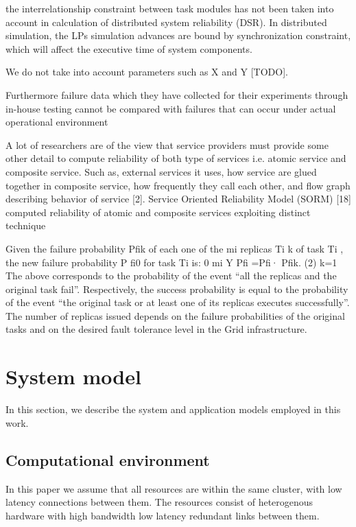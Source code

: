 \documentclass{cslthse-msc}
\begin{document}
the interrelationship constraint between task modules has not been taken into account in calculation of distributed system reliability (DSR). In distributed simulation, the LPs simulation advances are bound by synchronization constraint, which will affect the executive time of system components. \cite{relModelDistSimSystem}

We do not take into account parameters such as X and Y [TODO].

Furthermore failure data which they have collected for their experiments through in-house testing cannot be compared with failures that can occur under actual operational environment \cite{surveyReliabilityDistr}

A lot of researchers are of the view that service providers must provide some other detail to compute reliability of both type of services i.e. atomic service and composite service. Such as, external services it uses, how service are glued together in composite service, how frequently they call each other, and flow graph describing behavior of service [2]. Service Oriented Reliability Model (SORM) [18] computed reliability of atomic and composite services exploiting distinct technique \cite{surveyReliabilityDistr}

Given the failure probability Pfik of each one of the mi replicas Ti k of task Ti , the new failure probability P fi0 for task Ti is:
0 mi Y
Pfi =Pfi· Pfik. (2) k=1
The above corresponds to the probability of the event “all the replicas and the original task fail”. Respectively, the success probability is equal to the probability of the event “the original task or at least one of its replicas executes successfully”. The number of replicas issued depends on the failure probabilities of the original tasks and on the desired fault tolerance level in the Grid infrastructure.  \cite{effTaskReplMobGrid}
\fi

\section{System model} \label{sec:design_system_model}
In this section, we describe the system and application models employed in this work.

\subsection{Computational environment} \label{subsec:design_comp_env}
In this paper we assume that all resources are within the same cluster, with low latency connections between them. The resources consist of heterogenous hardware with high bandwidth low latency redundant links between them.
\end{document}
